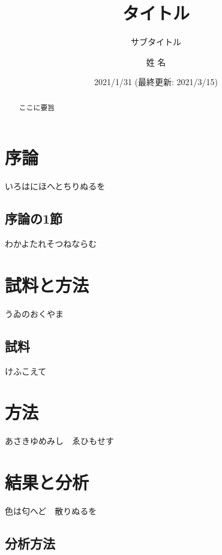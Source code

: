 \documentclass[
  pandoc,
  jafont = haranoaji,
  a4paper,
  everyparhook = compat,
  japaram = {units = true}]{bxjsarticle}
\title{タイトル}
\subtitle{サブタイトル}
\author{姓 名}
\date{2021/1/31 (最終更新: 2021/3/15)}
\begin{document}
\maketitle
\begin{abstract}
ここに要旨
\end{abstract}

{
\setcounter{tocdepth}{2}
\tableofcontents
}
\thispagestyle{empty}
\pagestyle{empty}

\hypertarget{ux5e8fux8ad6}{%
\section{序論}\label{ux5e8fux8ad6}}

いろはにほへとちりぬるを

\hypertarget{ux5e8fux8ad6ux306e1ux7bc0}{%
\subsection{序論の1節}\label{ux5e8fux8ad6ux306e1ux7bc0}}

わかよたれそつねならむ

\hypertarget{ux8a66ux6599ux3068ux65b9ux6cd5}{%
\section{試料と方法}\label{ux8a66ux6599ux3068ux65b9ux6cd5}}

うゐのおくやま

\hypertarget{ux8a66ux6599}{%
\subsection{試料}\label{ux8a66ux6599}}

けふこえて

\hypertarget{ux65b9ux6cd5}{%
\section{方法}\label{ux65b9ux6cd5}}

あさきゆめみし　ゑひもせす

\hypertarget{ux7d50ux679cux3068ux5206ux6790}{%
\section{結果と分析}\label{ux7d50ux679cux3068ux5206ux6790}}

色は匂へど　散りぬるを

\hypertarget{ux5206ux6790ux65b9ux6cd5}{%
\subsection{分析方法}\label{ux5206ux6790ux65b9ux6cd5}}
\end{document}
